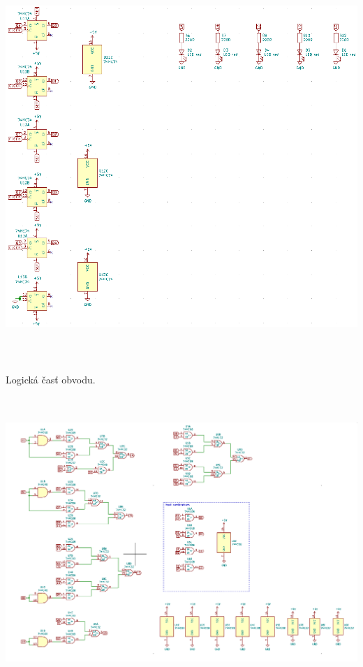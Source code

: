 \begin{center}
    \includegraphics[width=16.2cm, height=14.7cm]{images/kicad3.png}
\end{center} 
\newpage
\noindent
Logická časť obvodu.
\begin{center}
    \includegraphics[width=16.2cm, height=11cm]{images/logic_kic.png}
\end{center}
